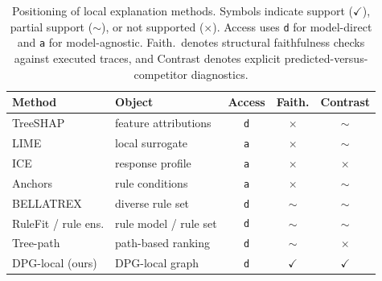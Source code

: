 \documentclass[runningheads]{llncs}
\begin{document}
\begin{table}[t]
\centering
\caption{Positioning of local explanation methods. Symbols indicate support ($\checkmark$), partial support ($\sim$), or not supported ($\times$). Access uses \texttt{d} for model-direct and \texttt{a} for model-agnostic. Faith.\ denotes structural faithfulness checks against executed traces, and Contrast denotes explicit predicted-versus-competitor diagnostics.}
\label{tab:positioning}
\small
\setlength{\tabcolsep}{6pt}
\begin{tabular}{l l c c c}
\hline
Method & Object & Access & Faith. & Contrast \\
\hline
TreeSHAP \cite{lundberg2018consistent} & feature attributions & \texttt{d} & $\times$ & $\sim$ \\
LIME \cite{ribeiro2016why} & local surrogate & \texttt{a} & $\times$ & $\sim$ \\
ICE \cite{goldstein2015ice} & response profile & \texttt{a} & $\times$ & $\times$ \\
Anchors \cite{ribeiro2018anchors} & rule conditions & \texttt{a} & $\times$ & $\sim$ \\
BELLATREX \cite{dedja2023bellatrex} & diverse rule set & \texttt{d} & $\sim$ & $\sim$ \\
RuleFit / rule ens. \cite{friedman2008predictive} & rule model / rule set & \texttt{d} & $\sim$ & $\sim$ \\
Tree-path \cite{palczewska2014interpreting} & path-based ranking & \texttt{d} & $\sim$ & $\times$ \\
\hline
DPG-local (ours) & DPG-local graph & \texttt{d} & $\checkmark$ & $\checkmark$ \\
\hline
\end{tabular}
\end{table}
\end{document}
